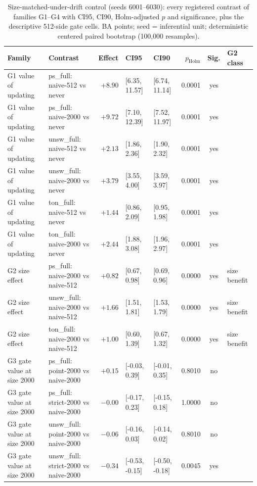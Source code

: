 \begin{table}[t]
\centering
\caption{Size-matched-under-drift control (seeds 6001--6030): every registered contrast of
families G1--G4 with CI95, CI90, Holm-adjusted $p$ and significance, plus the descriptive
512-side gate cells. BA points; seed = inferential unit; deterministic centered paired
bootstrap (100{,}000 resamples).}
\label{tab:size_matched_drift_supp}
\scriptsize
\setlength{\tabcolsep}{3pt}
\begin{tabular}{l l r l l r c l}
\toprule
Family & Contrast & Effect & CI95 & CI90 & $p_{\mathrm{Holm}}$ & Sig. & G2 class \\
\midrule
G1 value of updating & ps\_full: naive-512 vs never & $+8.90$ & [6.35, 11.57] & [6.74, 11.14] & 0.0001 & yes &  \\
G1 value of updating & ps\_full: naive-2000 vs never & $+9.72$ & [7.10, 12.39] & [7.52, 11.97] & 0.0001 & yes &  \\
G1 value of updating & unsw\_full: naive-512 vs never & $+2.13$ & [1.86, 2.36] & [1.90, 2.32] & 0.0001 & yes &  \\
G1 value of updating & unsw\_full: naive-2000 vs never & $+3.79$ & [3.55, 4.00] & [3.59, 3.97] & 0.0001 & yes &  \\
G1 value of updating & ton\_full: naive-512 vs never & $+1.44$ & [0.86, 2.09] & [0.95, 1.98] & 0.0001 & yes &  \\
G1 value of updating & ton\_full: naive-2000 vs never & $+2.44$ & [1.88, 3.08] & [1.96, 2.97] & 0.0001 & yes &  \\
G2 size effect & ps\_full: naive-2000 vs naive-512 & $+0.82$ & [0.67, 0.98] & [0.69, 0.96] & 0.0000 & yes & size benefit \\
G2 size effect & unsw\_full: naive-2000 vs naive-512 & $+1.66$ & [1.51, 1.81] & [1.53, 1.79] & 0.0000 & yes & size benefit \\
G2 size effect & ton\_full: naive-2000 vs naive-512 & $+1.00$ & [0.60, 1.39] & [0.67, 1.32] & 0.0000 & yes & size benefit \\
G3 gate value at size 2000 & ps\_full: point-2000 vs naive-2000 & $+0.15$ & [-0.03, 0.39] & [-0.01, 0.35] & 0.8010 & no &  \\
G3 gate value at size 2000 & ps\_full: strict-2000 vs naive-2000 & $-0.00$ & [-0.17, 0.23] & [-0.15, 0.18] & 1.0000 & no &  \\
G3 gate value at size 2000 & unsw\_full: point-2000 vs naive-2000 & $-0.06$ & [-0.16, 0.03] & [-0.14, 0.02] & 0.8010 & no &  \\
G3 gate value at size 2000 & unsw\_full: strict-2000 vs naive-2000 & $-0.34$ & [-0.53, -0.15] & [-0.50, -0.18] & 0.0045 & yes &  \\

\end{tabular}
\end{table}
